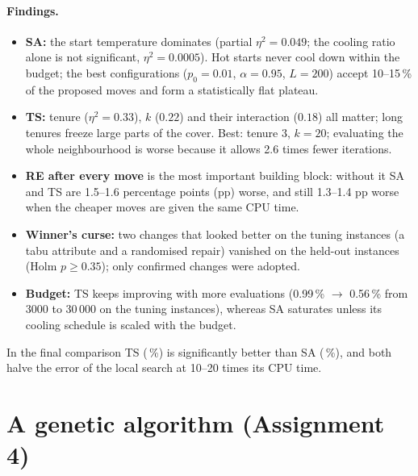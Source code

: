 \documentclass[11pt,a4paper]{article}
\begin{document}
\paragraph{Findings.}
\begin{itemize}
\item \textbf{SA:} the start temperature dominates (partial $\eta^2=0.049$; the cooling ratio alone is not significant, $\eta^2=0.0005$). Hot starts never cool down within the budget; the best configurations ($p_0=0.01$, $\alpha=0.95$, $L=200$) accept 10--15\,\% of the proposed moves and form a statistically flat plateau.
\item \textbf{TS:} tenure ($\eta^2=0.33$), $k$ ($0.22$) and their interaction ($0.18$) all matter; long tenures freeze large parts of the cover. Best: tenure 3, $k=20$; evaluating the whole neighbourhood is worse because it allows 2.6 times fewer iterations.
\item \textbf{RE after every move} is the most important building block: without it SA and TS are 1.5--1.6 percentage points (pp) worse, and still 1.3--1.4 pp worse when the cheaper moves are given the same CPU time.
\item \textbf{Winner's curse:} two changes that looked better on the tuning instances (a tabu attribute and a randomised repair) vanished on the held-out instances (Holm $p\ge 0.35$); only confirmed changes were adopted.
\item \textbf{Budget:} TS keeps improving with more evaluations (0.99\,\% $\to$ 0.56\,\% from 3000 to 30\,000 on the tuning instances), whereas SA saturates unless its cooling schedule is scaled with the budget.
\end{itemize}
In the final comparison TS (\devTS\,\%) is significantly better than SA (\devSA\,\%), and both halve the error of the local search at 10--20 times its CPU time.

\section{A genetic algorithm (Assignment 4)}\label{sec:ga}
\end{document}
